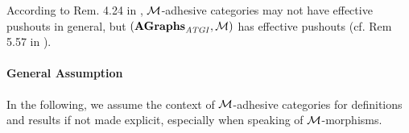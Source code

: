 \begin{remark}
\label{rem:sec-gt-M-adh:eff_po}
According to Rem. 4.24 in \cite{FAGT2}, ${\cal M}$-adhesive categories may not have effective pushouts in general, but $(\mathbf{AGraphs}_\mathit{ATGI},{\cal M})$ has effective pushouts (cf. Rem 5.57 in \cite{FAGT2}).
\envEndMarker
\end{remark}

\paragraph*{General Assumption}
In the following, we assume the context of ${\cal M}$-adhesive categories for definitions and results if not made explicit, especially when speaking of ${\cal M}$-morphisms.
